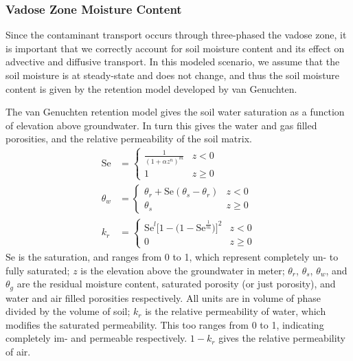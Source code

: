 \subsubsection{Vadose Zone Moisture Content}

Since the contaminant transport occurs through three-phased the vadose zone, it is important that we correctly account for soil moisture content and its effect on advective and diffusive transport.
In this modeled scenario, we assume that the soil moisture is at steady-state and does not change, and thus the soil moisture content is given by the retention model developed by van Genuchten.\par

The van Genuchten retention model gives the soil water saturation as a function of elevation above groundwater.
In turn this gives the water and gas filled porosities, and the relative permeability of the soil matrix.
\begin{align}
  \mathrm{Se} &=
    \begin{cases}\label{eq:van_genuchten_saturation}
      \frac{1}{(1 + \alpha z^n)^m} & z < 0 \\
    1 & z \geq 0
    \end{cases} \\
  \theta_w &=
    \begin{cases}\label{eq:van_genuchten_soil_moisture}
      \theta_r + \mathrm{Se}(\theta_s - \theta_r) & z < 0 \\
      \theta_s & z \geq 0
    \end{cases} \\
  k_r &=
    \begin{cases}\label{eq:van_genuchten_relative_permeability}
      \mathrm{Se}^l \big[ 1 - \big( 1 - \mathrm{Se}^\frac{1}{m} \big) \big]^2 & z < 0 \\
      0 & z \geq 0
    \end{cases}
\end{align}
$\mathrm{Se}$ is the saturation, and ranges from 0 to 1, which represent completely un- to fully saturated;
$z$ is the elevation above the groundwater in meter;
$\theta_r$, $\theta_s$, $\theta_w$, and $\theta_g$ are the residual moisture content, saturated porosity (or just porosity), and water and air filled porosities respectively. All units are in volume of phase divided by the volume of soil;
$k_r$ is the relative permeability of water, which modifies the saturated permeability. This too ranges from 0 to 1, indicating completely im- and permeable respectively. $1-k_r$ gives the relative permeability of air.\par


